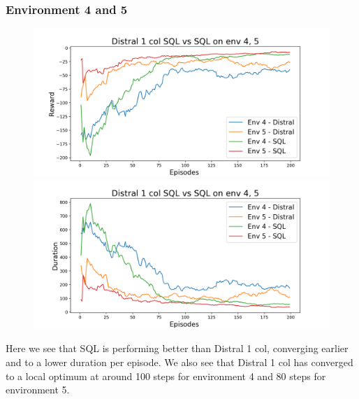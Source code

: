 \documentclass[12pt]{report}
\begin{document}
\subsubsection{Environment 4 and 5}
\begin{figure}[H]
\centering
\begin{minipage}{.5\textwidth}
\centering
\includegraphics[width=\textwidth]{figs/d1_col_sql/d1_col_sql_4_5_rwd.png}
\end{minipage}%
\centering
\begin{minipage}{.5\textwidth}
\centering
\includegraphics[width=\textwidth]{figs/d1_col_sql/d1_col_sql_4_5_dur.png}
\end{minipage}%
\end{figure}
Here we see that SQL is performing better than Distral 1 col, converging earlier and to a lower duration per episode. We also see that Distral 1 col has converged to a local optimum at around 100 steps for environment 4 and 80 steps for environment 5.
\end{document}
